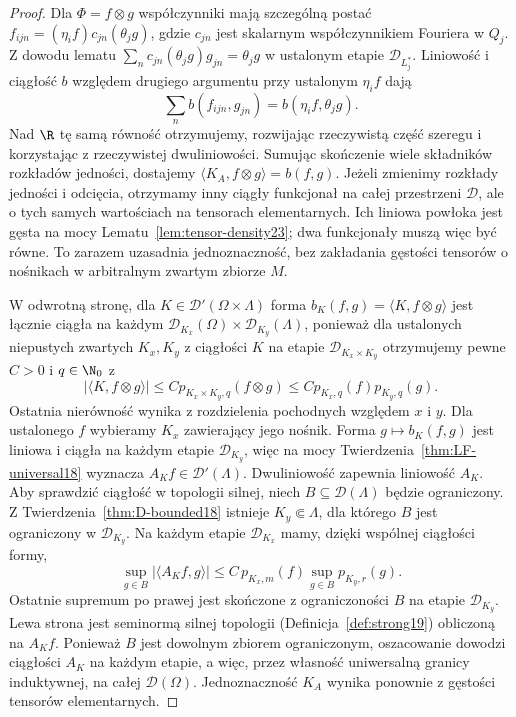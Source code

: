 \begin{proof}
Dla $\Phi=f\otimes g$ współczynniki mają szczególną
postać $f_{ijn}=(\eta_i f)c_{jn}(\theta_j g)$,
gdzie $c_{jn}$ jest skalarnym współczynnikiem Fouriera
w $Q_j$. Z dowodu lematu
$\sum_n c_{jn}(\theta_j g)g_{jn}=\theta_j g$
w ustalonym etapie $\mathcal D_{L_j^*}$.
Liniowość i ciągłość $b$ względem drugiego argumentu
przy ustalonym $\eta_i f$ dają
\[
 \sum_n b(f_{ijn},g_{jn})=b(\eta_i f,\theta_j g).
\]
Nad $\R$ tę samą równość otrzymujemy, rozwijając
rzeczywistą część szeregu i korzystając z rzeczywistej
dwuliniowości. Sumując skończenie wiele składników
rozkładów jedności, dostajemy
$\langle K_A,f\otimes g\rangle=b(f,g)$.
Jeżeli zmienimy rozkłady jedności i odcięcia, otrzymamy
inny ciągły funkcjonał na całej przestrzeni $\mathcal D$,
ale o tych samych wartościach na tensorach elementarnych.
Ich liniowa powłoka jest gęsta na mocy
Lematu~\ref{lem:tensor-density23}; dwa funkcjonały muszą
więc być równe. To zarazem uzasadnia jednoznaczność,
bez zakładania gęstości tensorów o nośnikach w arbitralnym
zwartym zbiorze $M$.

W odwrotną stronę, dla $K\in\mathcal D'(\Omega\times\Lambda)$
forma $b_K(f,g)=\langle K,f\otimes g\rangle$ jest
łącznie ciągła na każdym
$\mathcal D_{K_x}(\Omega)\times\mathcal D_{K_y}(\Lambda)$,
ponieważ dla ustalonych niepustych zwartych $K_x,K_y$
z ciągłości $K$ na etapie $\mathcal D_{K_x\times K_y}$
otrzymujemy pewne $C>0$ i $q\in\N_0$ z
\[
 |\langle K,f\otimes g\rangle|
 \le C p_{K_x\times K_y,q}(f\otimes g)
 \le C p_{K_x,q}(f)p_{K_y,q}(g).
\]
Ostatnia nierówność wynika z rozdzielenia pochodnych
względem $x$ i $y$. Dla ustalonego $f$ wybieramy
$K_x$ zawierający jego nośnik. Forma $g\mapsto b_K(f,g)$
jest liniowa i ciągła na każdym etapie $\mathcal D_{K_y}$,
więc na mocy Twierdzenia~\ref{thm:LF-universal18}
wyznacza $A_Kf\in\mathcal D'(\Lambda)$. Dwuliniowość
zapewnia liniowość $A_K$.
Aby sprawdzić ciągłość w topologii silnej, niech
$B\subseteq\mathcal D(\Lambda)$ będzie ograniczony.
Z Twierdzenia~\ref{thm:D-bounded18} istnieje
$K_y\Subset\Lambda$, dla którego $B$ jest ograniczony
w $\mathcal D_{K_y}$. Na każdym etapie $\mathcal D_{K_x}$
mamy, dzięki wspólnej ciągłości formy,
\[
 \sup_{g\in B}|\langle A_Kf,g\rangle|
 \le C\,p_{K_x,m}(f)\sup_{g\in B}p_{K_y,r}(g).
\]
Ostatnie supremum po prawej jest skończone
z ograniczoności $B$ na etapie $\mathcal D_{K_y}$.
Lewa strona jest seminormą silnej topologii
(Definicja~\ref{def:strong19}) obliczoną na $A_Kf$.
Ponieważ $B$ jest dowolnym zbiorem ograniczonym,
oszacowanie dowodzi ciągłości $A_K$ na każdym etapie,
a więc, przez własność uniwersalną granicy induktywnej,
na całej $\mathcal D(\Omega)$. Jednoznaczność $K_A$
wynika ponownie z gęstości tensorów elementarnych.
\end{proof}

